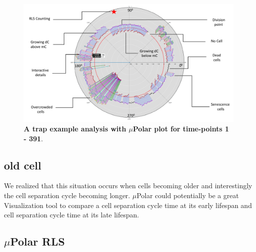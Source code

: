 \documentclass[conference]{IEEEtran}
\begin{document}
\begin{figure}
\centering
\includegraphics[width=\textwidth,height=10 cm]{Patterns/explain.pdf}
\caption{ \textbf{A trap example analysis with $\mu$Polar plot for time-points 1 - 391}.}
\label{fig:explain}
\end{figure}





\subsection{ old cell  }
We realized that this situation occurs when cells becoming older and interestingly the cell separation cycle becoming longer. $\mu$Polar could potentially be a great Visualization tool to compare a cell separation cycle time at its early lifespan and cell separation cycle time at its late lifespan.






\subsection{$\mu$Polar RLS}
\end{document}
